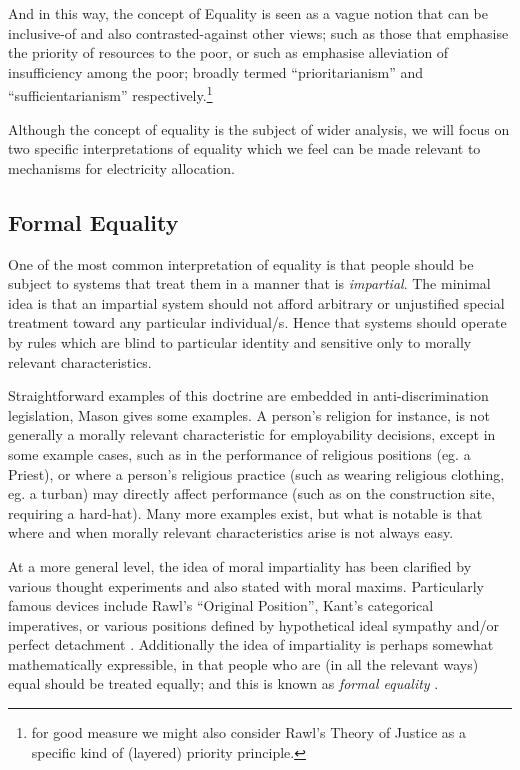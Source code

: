 And in this way, the concept of Equality is seen as a vague notion that can be inclusive-of and also contrasted-against other views; such as those that emphasise the priority of resources to the poor, or such as emphasise alleviation of insufficiency among the poor; broadly termed ``prioritarianism'' and ``sufficientarianism'' respectively.\cite{sep-egalitarianism}\footnote{for good measure we might also consider Rawl's Theory of Justice \cite{rawls2005theory} as a specific kind of (layered) priority principle.}

Although the concept of equality is the subject of wider analysis, we will focus on two specific interpretations of equality which we feel can be made relevant to mechanisms for electricity allocation.

\subsection{Formal Equality}\label{sec:formal_equality}

One of the most common interpretation of equality is that people should be subject to systems that treat them in a manner that is \textit{impartial}. The minimal idea is that an impartial system should not afford arbitrary or unjustified special treatment toward any particular individual/s. Hence that systems should operate by rules which are blind to particular identity and sensitive only to morally relevant characteristics.

Straightforward examples of this doctrine are embedded in anti-discrimination legislation, Mason \cite{mason2006levelling} gives some examples.  A person's religion for instance, is not generally a morally relevant characteristic for employability decisions, except in some example cases, such as in the performance of religious positions (eg. a Priest), or where a person's religious practice (such as wearing religious clothing, eg. a turban) may directly affect performance (such as on the construction site, requiring a hard-hat).
Many more examples exist, but what is notable is that where and when morally relevant characteristics arise is not always easy.

At a more general level, the idea of moral impartiality has been clarified by various thought experiments and also stated with moral maxims.
Particularly famous devices include Rawl's ``Original Position'', Kant's categorical imperatives, or various positions defined by hypothetical ideal sympathy and/or perfect detachment \cite{smithGutenberg, nla.cat-vn197822,10.2307/2103988}.
Additionally the idea of impartiality is perhaps somewhat mathematically expressible, in that people who are (in all the relevant ways) equal should be treated equally; and this is known as \textit{formal equality} \cite{whatisbasicequalitynathan}.

